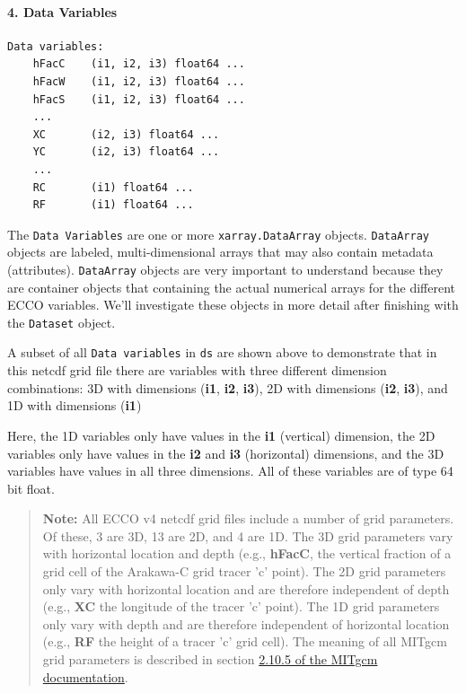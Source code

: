 \documentclass[11pt]{article}
\begin{document}
\paragraph{4. Data Variables}\label{data-variables}

\begin{verbatim}
Data variables:
    hFacC    (i1, i2, i3) float64 ...
    hFacW    (i1, i2, i3) float64 ...
    hFacS    (i1, i2, i3) float64 ...
    ...
    XC       (i2, i3) float64 ...
    YC       (i2, i3) float64 ...
    ...
    RC       (i1) float64 ...
    RF       (i1) float64 ...
\end{verbatim}

The \texttt{Data\ Variables} are one or more \texttt{xarray.DataArray}
objects. \texttt{DataArray} objects are labeled, multi-dimensional
arrays that may also contain metadata (attributes). \texttt{DataArray}
objects are very important to understand because they are container
objects that containing the actual numerical arrays for the different
ECCO variables. We'll investigate these objects in more detail after
finishing with the \texttt{Dataset} object.

A subset of all \texttt{Data\ variables} in \texttt{ds} are shown above
to demonstrate that in this netcdf grid file there are variables with
three different dimension combinations: 3D with dimensions (\textbf{i1},
\textbf{i2}, \textbf{i3}), 2D with dimensions (\textbf{i2},
\textbf{i3}), and 1D with dimensions (\textbf{i1})

Here, the 1D variables only have values in the \textbf{i1} (vertical)
dimension, the 2D variables only have values in the \textbf{i2} and
\textbf{i3} (horizontal) dimensions, and the 3D variables have values in
all three dimensions. All of these variables are of type 64 bit float.

\begin{quote}
\textbf{Note:} All ECCO v4 netcdf grid files include a number of grid
parameters. Of these, 3 are 3D, 13 are 2D, and 4 are 1D. The 3D grid
parameters vary with horizontal location and depth (e.g.,
\textbf{hFacC}, the vertical fraction of a grid cell of the Arakawa-C
grid tracer 'c' point). The 2D grid parameters only vary with horizontal
location and are therefore independent of depth (e.g., \textbf{XC} the
longitude of the tracer 'c' point). The 1D grid parameters only vary
with depth and are therefore independent of horizontal location (e.g.,
\textbf{RF} the height of a tracer 'c' grid cell). The meaning of all
MITgcm grid parameters is described in section
\href{http://mitgcm.org/sealion/online_documents/node47.html}{2.10.5 of
the MITgcm documentation}.
\end{quote}
\end{document}
